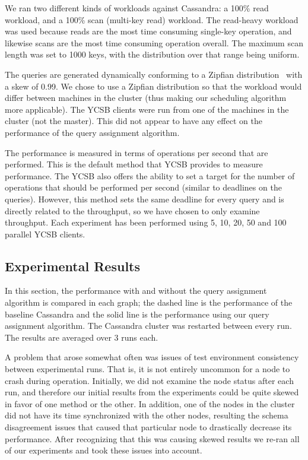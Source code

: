 We ran two different kinds of workloads against Cassandra: a 100\% read workload, and a 100\% scan (multi-key read) workload. The read-heavy workload was used because reads are the most time consuming single-key operation, and likewise scans are the most time consuming operation overall. The maximum scan length was set to 1000 keys, with the distribution over that range being uniform.

The queries are generated dynamically conforming to a Zipfian distribution~\cite{Gray:1994:QGB:191843.191886} with a skew of 0.99. We chose to use a Zipfian distribution so that the workload would differ between machines in the cluster (thus making our scheduling algorithm more applicable). The YCSB clients were run from one of the machines in the cluster (not the master). This did not appear to have any effect on the performance of the query assignment algorithm. 

The performance is measured in terms of operations per second that are performed. This is the default method that YCSB provides to measure performance. The YCSB also offers the ability to set a target for the number of operations that should be performed per second (similar to deadlines on the queries). However, this method sets the same deadline for every query and is directly related to the throughput, so we have chosen to only examine throughput. Each experiment has been performed using 5, 10, 20, 50 and 100 parallel YCSB clients.

\subsection{Experimental Results}
In this section, the performance with and without the query assignment algorithm is compared in each graph; the dashed line is the performance of the baseline Cassandra and the solid line is the performance using our query assignment algorithm. The Cassandra cluster was restarted between every run. The results are averaged over 3 runs each.

A problem that arose somewhat often was issues of test environment consistency between experimental runs. That is, it is not entirely uncommon for a node to crash during operation. Initially, we did not examine the node status after each run, and therefore our initial results from the experiments could be quite skewed in favor of one method or the other. In addition, one of the nodes in the cluster did not have its time synchronized with the other nodes, resulting the schema disagreement issues that caused that particular node to drastically decrease its performance. After recognizing that this was causing skewed results we re-ran all of our experiments and took these issues into account.

